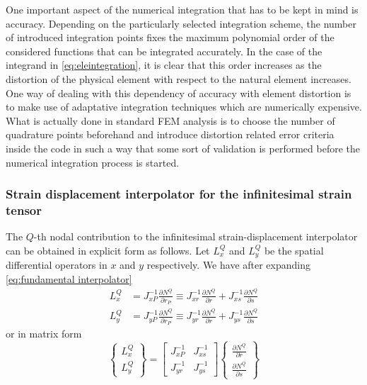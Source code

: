 One important aspect of the numerical integration that has to be kept in mind is accuracy.  Depending on the particularly selected integration scheme, the number of introduced integration points fixes the maximum polynomial order of the considered functions that can be integrated accurately.  In the case of the integrand in \cref{eq:eleintegration}, it is clear that this order increases as the distortion of the physical element  with respect to the natural element increases.  One way of dealing with this dependency of accuracy with element distortion is to make use of adaptative integration techniques which are numerically expensive.  What is actually done in standard FEM analysis is to choose the number of quadrature points beforehand and introduce distortion related error criteria inside the code in such a way that some sort of validation is performed before the numerical integration process is started.

\subsubsection*{Strain displacement interpolator for the infinitesimal strain tensor}
The $Q$-th nodal contribution to the infinitesimal strain-displacement interpolator can be obtained in explicit form as follows. Let $L_x^Q$ and $L_y^Q$ be the spatial differential operators in $x$ and $y$ respectively. We have after expanding \cref{eq:fundamental interpolator}
%
\begin{align*}
L_x^Q & = J_{xP}^{-1}\frac{\partial N^Q}{\partial r_P} \equiv J_{xr}^{-1}\frac{\partial N^Q}{\partial r} + J_{xs}^{-1}\frac{\partial N^Q}{\partial s}\\
L_y^Q & = J_{yP}^{-1}\frac{\partial N^Q}{\partial r_P} \equiv J_{yr}^{-1}\frac{\partial N^Q}{\partial r} + J_{ys}^{-1}\frac{\partial N^Q}{\partial s}
\end{align*}
%
or in matrix form
%
\begin{equation}
\begin{Bmatrix}
L_x^Q\\
L_y^Q
\end{Bmatrix} = 
\begin{bmatrix}
J_{xP}^{-1} &J_{xs}^{- 1}\\
J_{yr}^{-1} &J_{ys}^{- 1}
\end{bmatrix}
\begin{Bmatrix}
\frac{\partial N^Q}{\partial r}\\
\frac{\partial N^Q}{\partial s}
\end{Bmatrix}
\end{equation}


